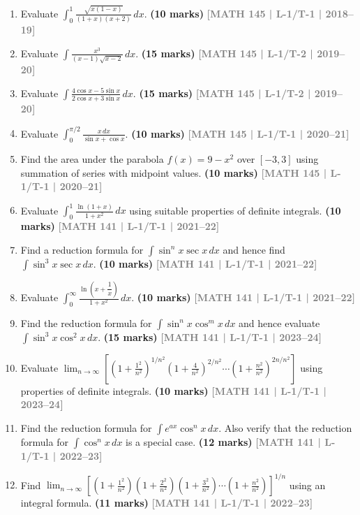 \documentclass[12pt,a4paper]{article}
\newcommand{\yr}[1]{\hfill\textcolor{gray}{\small\textbf{[#1]}}}
\newcommand{\mk}[1]{\textcolor{orange!70!black}{\small\textbf{(#1 marks)}}}
\begin{document}
\begin{enumerate}
\item Evaluate $\displaystyle\int_{0}^{1}\frac{\sqrt{x(1-x)}}{(1+x)(x+2)}\,dx$.
\mk{10} \yr{MATH 145 | L-1/T-1 | 2018--19}

\item Evaluate $\displaystyle\int\frac{x^{3}}{(x-1)\sqrt{x-2}}\,dx$.
\mk{15} \yr{MATH 145 | L-1/T-2 | 2019--20}

\item Evaluate $\displaystyle\int\frac{4\cos x-5\sin x}{2\cos x+3\sin x}\,dx$.
\mk{15} \yr{MATH 145 | L-1/T-2 | 2019--20}

\item Evaluate $\displaystyle\int_{0}^{\pi/2}\frac{x\,dx}{\sin x+\cos x}$.
\mk{10} \yr{MATH 145 | L-1/T-1 | 2020--21}

\item Find the area under the parabola $f(x)=9-x^{2}$ over $[-3,3]$ using summation of series with midpoint values.
\mk{10} \yr{MATH 145 | L-1/T-1 | 2020--21}

\item Evaluate $\displaystyle\int_{0}^{1}\frac{\ln(1+x)}{1+x^{2}}\,dx$ using suitable properties of definite integrals.
\mk{10} \yr{MATH 141 | L-1/T-1 | 2021--22}

\item Find a reduction formula for $\displaystyle\int\sin^{n}x\sec x\,dx$ and hence find $\displaystyle\int\sin^{3}x\sec x\,dx$.
\mk{10} \yr{MATH 141 | L-1/T-1 | 2021--22}

\item Evaluate $\displaystyle\int_{0}^{\infty}\frac{\ln\!\left(x+\dfrac{1}{x}\right)}{1+x^{2}}\,dx$.
\mk{10} \yr{MATH 141 | L-1/T-1 | 2021--22}

\item Find the reduction formula for $\displaystyle\int\sin^{n}x\cos^{m}x\,dx$ and hence evaluate $\displaystyle\int\sin^{3}x\cos^{2}x\,dx$.
\mk{15} \yr{MATH 141 | L-1/T-1 | 2023--24}

\item Evaluate $\displaystyle\lim_{n\to\infty}\!\left[\left(1+\frac{1^{2}}{n^{2}}\right)^{1/n^{2}}\!\!\left(1+\frac{4}{n^{2}}\right)^{2/n^{2}}\!\!\cdots\left(1+\frac{n^{2}}{n^{2}}\right)^{2n/n^{2}}\right]$ using properties of definite integrals.
\mk{10} \yr{MATH 141 | L-1/T-1 | 2023--24}

\item Find the reduction formula for $\displaystyle\int e^{ax}\cos^{n}x\,dx$. Also verify that the reduction formula for $\displaystyle\int\cos^{n}x\,dx$ is a special case.
\mk{12} \yr{MATH 141 | L-1/T-1 | 2022--23}

\item Find $\displaystyle\lim_{n\to\infty}\!\left[\left(1+\frac{1^{2}}{n^{2}}\right)\!\left(1+\frac{2^{2}}{n^{2}}\right)\!\left(1+\frac{3^{2}}{n^{2}}\right)\cdots\left(1+\frac{n^{2}}{n^{2}}\right)\right]^{1/n}$ using an integral formula.
\mk{11} \yr{MATH 141 | L-1/T-1 | 2022--23}

\end{enumerate}
\end{document}
